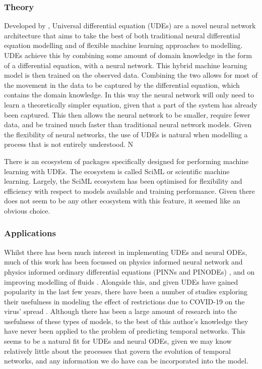 \documentclass[12pt]{amsart}
\begin{document}
    \subsubsection{Theory}
        Developed by \cite{SciML_C_Rak}, Universal differential equation (UDEs) are a novel neural network architecture that aims to take the best of both traditional neural differential equation modelling and of flexible machine learning approaches to modelling. UDEs achieve this by combining some amount of domain knowledge in the form of a differential equation, with a neural network. This hybrid machine learning model is then trained on the observed data. Combining the two allows for most of the movement in the data to be captured by the differential equation, which contains the domain knowledge. In this way the neural network will only need to learn a theoretically simpler equation, given that a part of the system has already been captured. This then allows the neural network to be smaller, require fewer data, and be trained much faster than traditional neural network models. Given the flexibility of neural networks, the use of UDEs is natural when modelling a process that is not entirely understood\cite{kidger2022neural}. N
        
        There is an ecosystem of packages specifically designed for performing machine learning with UDEs. The ecosystem is called SciML or scientific machine learning\cite{SciML_C_Rak}. Largely, the SciML ecosystem has been optimised for flexibility and efficiency with respect to models available and training performance. Given there does not seem to be any other ecosystem with this feature, it seemed like 
        an obvious choice.
    
    \subsubsection{Applications}
        Whilst there has been much interest in implementing UDEs and neural ODEs, much of this work has been focussed on physics informed neural network and physics informed ordinary differential equations (PINNs and PINODEs) \cite{karniadakis2021physics,GAO2021110079,krishnapriyan2021characterizing,roehrl2020modeling}, and on improving modelling of fluids \cite{mahmoudabadbozchelou2021data,nguyen2022physics}. Alongside this, and given UDEs have gained popularity in the last few years, there have been a number of studies exploring their usefulness in modeling the effect of restrictions due to COVID-19 on the virus' spread \cite{Dandekar2020.04.03.20052084}. Although there has been a large amount of research into the usefulness of these types of models, to the best of this author's knowledge they have never been applied to the problem of predicting temporal networks. This seems to be a natural fit for UDEs and neural ODEs, given we may know relatively little about the processes that govern the evolution of temporal networks, and any information we do have can be incorporated into the model.
\end{document}
